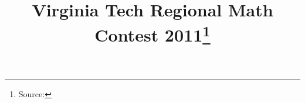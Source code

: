 \documentclass[10pt]{article}
\begin{document}
\title{Virginia Tech Regional Math Contest 2011\footnote{Source: \source}}
\author{\vspace{-2ex}}
\date{\vspace{-6ex}} %
\maketitle







\end{document}
